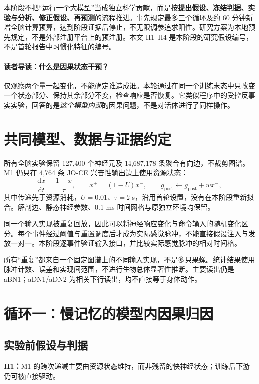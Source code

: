 \documentclass[UTF8,a4paper,zihao=-4,fontset=none]{ctexart}
\begin{document}
本阶段不把“运行一个大模型”当成独立科学贡献，而是按\textbf{提出假设、冻结判据、实验与分析、修正假设、再预测}的流程推进。事先规定最多三个循环及约 60 分钟新增全脑计算预算，达到阶段证据后停止，不无限调参追求阳性。研究方案为本地预先规定，不是外部注册平台上的预注册。本文 H1--H4 是本阶段的研究假设编号，不是首轮报告中习惯化特征的编号。

\paragraph{读者导读：什么是因果状态干预？}
仅观察两个量一起变化，不能确定谁造成谁。本轮通过在同一个训练末态中只改变一个状态部分、保持其余部分不变，检查响应是否恢复。它类似程序中的受控反事实实验，回答的是\emph{这个模型内部}的因果问题，不是对活体进行了同样操作。

\section{共同模型、数据与证据约定}
所有全脑实验保留 127,400 个神经元及 14,687,178 条聚合有向边，不裁剪图谱。M1 仍只在 4,764 条 JO-CE 兴奋性输出边上使用资源状态：
\begin{equation}
\frac{\mathrm{d}x}{\mathrm{d}t}=\frac{1-x}{\tau},\qquad
x^{+}=(1-U)x^{-},\qquad g_{\mathrm{post}}\leftarrow g_{\mathrm{post}}+wx^{-},
\end{equation}
其中传递先于资源消耗，$U=0.01$、$\tau=2$ s，沿用首轮设置，没有在本阶段重新拟合。解剖边、静态神经参数、0.1 ms 时间网格与原独立环境均保留。

同一个输入实现被重复回放，因此可以将神经响应变化与命令输入的随机变化区分。每个事件经过阈值与重置调度后才成为实际感觉脉冲，不能直接假设注入与发放一对一。本阶段逐事件验证输入接口，并比较实际感觉脉冲的相对时间格。

所有“重复”都来自一个固定图谱上的不同输入实现，不是多只果蝇。统计结果使用脉冲计数、误差和实现间范围，不进行生物总体显著性推断。主要读出仍是 aBN1；aDN1/aDN2 为相关下行读出，均不直接等于身体动作。

\section{循环一：慢记忆的模型内因果归因}
\subsection{实验前假设与判据}
\textbf{H1：}M1 的跨次递减主要由资源状态维持，而非残留的快神经状态；训练后下游仍可被直接驱动。
\end{document}

